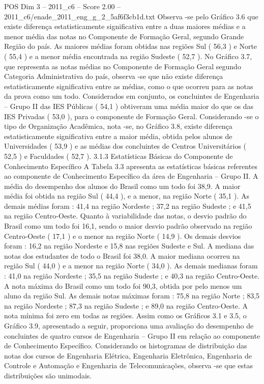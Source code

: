 \begin{textsample}{POS Dim 3 – 2011\_c6 – Score 2.00 – 2011\_c6/enade\_2011\_eng\_g\_2\_5af6f3cb1d.txt}
Observa -se pelo Gráfico 3.6 que existe diferença estatisticamente significativa entre a duas maiores médias e a menor média das notas no Componente de Formação Geral, segundo Grande Região do país.
As maiores médias foram obtidas nas regiões Sul ( 56,3 ) e Norte ( 55,4 ) e a menor média encontrada na região Sudeste ( 52,7 ).
No Gráfico 3.7, que representa as notas médias no Componente de Formação Geral segundo Categoria Administrativa do país, observa -se que não existe diferença estatisticamente significativa entre as médias, como o que ocorreu para as notas da prova como um todo.
Considerados em conjunto, os concluintes de Engenharia – Grupo II das IES Públicas ( 54,1 ) obtiveram uma média maior do que os das IES Privadas ( 53,0 ), para o componente de Formação Geral.
Considerando -se o tipo de Organização Acadêmica, nota -se, no Gráfico 3.8, existe diferença estatisticamente significativa entre a maior média, obtida pelos alunos de Universidades ( 53,9 ) e as médias dos concluintes de Centros Universitários ( 52,5 ) e Faculdades ( 52,7 ). 3.1.3 Estatísticas Básicas do Componente de Conhecimento Específico A Tabela 3.3 apresenta as estatísticas básicas referentes ao componente de Conhecimento Específico da área de Engenharia – Grupo II.
A média do desempenho dos alunos do Brasil como um todo foi 38,9.
A maior média foi obtida na região Sul ( 44,4 ), e a menor, na região Norte ( 35,1 ).
As demais médias foram : 41,4 na região Nordeste ; 37,2 na região Sudeste ; e 41,5 na região Centro-Oeste.
Quanto à variabilidade das notas, o desvio padrão do Brasil como um todo foi 16,1, sendo o maior desvio padrão observado na região Centro-Oeste ( 17,1 ) e o menor na região Norte ( 14,9 ).
Os demais desvios foram : 16,2 na região Nordeste e 15,8 nas regiões Sudeste e Sul.
A mediana das notas dos estudantes de todo o Brasil foi 38,0.
A maior mediana ocorreu na região Sul ( 44,0 ) e a menor na região Norte ( 34,0 ).
As demais medianas foram : 41,0 na região Nordeste ; 35,5 na região Sudeste ; e 40,3 na região Centro-Oeste.
A nota máxima do Brasil como um todo foi 90,3, obtida por pelo menos um aluno da região Sul.
As demais notas máximas foram : 75,8 na região Norte ; 83,5 na região Nordeste ; 87,3 na região Sudeste ; e 89,0 na região Centro-Oeste.
A nota mínima foi zero em todas as regiões.
Assim como os Gráficos 3.1 e 3.5, o Gráfico 3.9, apresentado a seguir, proporciona uma avaliação do desempenho de concluintes de quatro cursos de Engenharia – Grupo II em relação ao componente de Conhecimento Específico.
Considerando os histogramas de distribuição das notas dos cursos de Engenharia Elétrica, Engenharia Eletrônica, Engenharia de Controle e Automação e Engenharia de Telecomunicações, observa -se que estas distribuições são unimodais.

\end{textsample}
